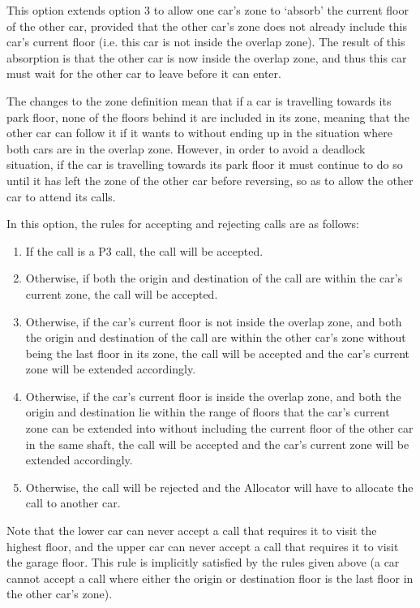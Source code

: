 \documentclass{UoYCSproject}
\begin{document}
This option extends option 3 to allow one car's zone to `absorb' the current floor of the other car, provided that the other car's zone does not already include this car's current floor (i.e. this car is not inside the overlap zone).  The result of this absorption is that the other car is now inside the overlap zone, and thus this car must wait for the other car to leave before it can enter.

The changes to the zone definition mean that if a car is travelling towards its park floor, none of the floors behind it are included in its zone, meaning that the other car can follow it if it wants to without ending up in the situation where both cars are in the overlap zone.  However, in order to avoid a deadlock situation, if the car is travelling towards its park floor it must continue to do so until it has left the zone of the other car before reversing, so as to allow the other car to attend its calls.

In this option, the rules for accepting and rejecting calls are as follows:
	\begin{enumerate}
		\item If the call is a P3 call, the call will be accepted.
		\item Otherwise, if both the origin and destination of the call are within the car's current zone, the call will be accepted.
		\item Otherwise, if the car's current floor is not inside the overlap zone, and both the origin and destination of the call are within the other car's zone without being the last floor in its zone, the call will be accepted and the car's current zone will be extended accordingly.
		\item Otherwise, if the car's current floor is inside the overlap zone, and both the origin and destination lie within the range of floors that the car's current zone can be extended into without including the current floor of the other car in the same shaft, the call will be accepted and the car's current zone will be extended accordingly.
		\item Otherwise, the call will be rejected and the Allocator will have to allocate the call to another car.
	\end{enumerate}

Note that the lower car can never accept a call that requires it to visit the highest floor, and the upper car can never accept a call that requires it to visit the garage floor.  This rule is implicitly satisfied by the rules given above (a car cannot accept a call where either the origin or destination floor is the last floor in the other car's zone).
\end{document}
